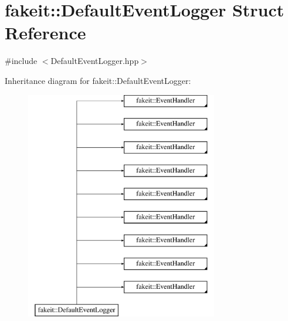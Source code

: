 \hypertarget{structfakeit_1_1DefaultEventLogger}{}\section{fakeit\+::Default\+Event\+Logger Struct Reference}
\label{structfakeit_1_1DefaultEventLogger}


{\ttfamily \#include $<$Default\+Event\+Logger.\+hpp$>$}

Inheritance diagram for fakeit\+::Default\+Event\+Logger\+:\begin{figure}[H]
\begin{center}
\leavevmode
\includegraphics[height=10.000000cm]{structfakeit_1_1DefaultEventLogger}
\end{center}
\end{figure}
